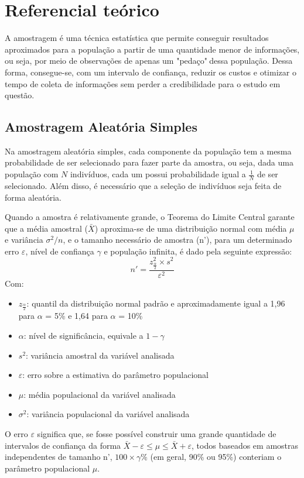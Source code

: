 \documentclass[a4paper, 12pt]{article}
\begin{document}
\section{Referencial teórico}

A amostragem é uma técnica estatística que permite conseguir resultados aproximados para a população a partir de uma quantidade menor de informações, ou seja, por meio de observações de apenas um "pedaço"$\:$dessa população. Dessa forma, consegue-se, com um intervalo de confiança, reduzir os custos e otimizar o tempo de coleta de informações sem perder a credibilidade para o estudo em questão.

\subsection{Amostragem Aleatória Simples}
Na amostragem aleatória simples, cada componente da população tem a mesma probabilidade de ser selecionado para fazer parte da amostra, ou seja, dada uma população com $N$ indivíduos, cada um possui probabilidade igual a $\displaystyle \frac{1}{N}$ de ser selecionado. Além disso, é necessário que a seleção de indivíduos seja feita de forma aleatória.

Quando a amostra é relativamente grande, o Teorema do Limite Central garante que a média amostral ($\bar{X}$) aproxima-se de uma distribuição normal com média $\mu$ e variância $\sigma^2/n$, e o tamanho necessário de amostra (n'), para um determinado erro $\varepsilon$, nível de confiança $\gamma$ e população infinita, é dado pela seguinte expressão:
{\large $$n'=\frac{z^2_\frac{\alpha}{2} \times s^2}{\varepsilon^2}$$} 
Com:
\begin{itemize}
\item $z_\frac{\alpha}{2}$: quantil da distribuição normal padrão e aproximadamente igual a 1,96 para $\alpha$ = 5\% e 1,64 para $\alpha$ = 10\%
\item $\alpha$: nível de significância, equivale a $1-\gamma$
\item $s^2$: variância amostral da variável analisada
\item $\varepsilon$: erro sobre a estimativa do parâmetro populacional
\item $\mu$: média populacional da variável analisada
\item $\sigma^2$: variância populacional da variável analisada
\end{itemize}

O erro $\varepsilon$ significa que, se fosse possível construir uma grande quantidade de intervalos de confiança da forma $\bar{X}-\varepsilon \leq \mu \leq \bar{X}+\varepsilon$, todos baseados em amostras independentes de tamanho n', $100 \times \gamma\%$ (em geral, 90\% ou 95\%) conteriam o parâmetro populacional $\mu$.
\end{document}

